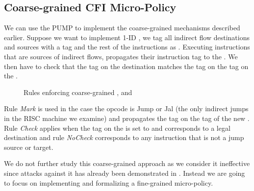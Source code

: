 \subsection{Coarse-grained CFI Micro-Policy}\label{sec:cfi_coarse}



We can use the PUMP to implement the coarse-grained \CFI mechanisms described
earlier. Suppose we want to implement 1-ID \CFI, we tag all indirect flow
destinations and sources with a tag \MARK{} and the rest of the instructions as
\UNMARK. Executing instructions that are sources of indirect flows, propagates
their instruction tag to the \pc. We then have to check that the tag on the
destination matches the tag on the tag on the \pc.

\begin{figure}[htb!]
\bigskip

\bigskip

\caption{Rules enforcing coarse-grained \CFI, \NXD and \NWC}
\end{figure}

Rule \emph{Mark} is used in the case the opcode is Jump or Jal (the
only indirect jumps in the RISC machine we examine) and propagates the
\MARKname tag on the tag of the new \pc. Rule \emph{Check} applies
when the tag on the \pc is set to \MARKname and corresponds to a legal
destination and rule \emph{NoCheck} corresponds to any instruction
that is not a jump source or target.

We do not further study this coarse-grained approach as we consider it
ineffective since attacks against it has already been demonstrated in
\cite{outofcontrol_ieeesp2014}. Instead we are going to focus on
implementing and formalizing a fine-grained \CFI micro-policy.

